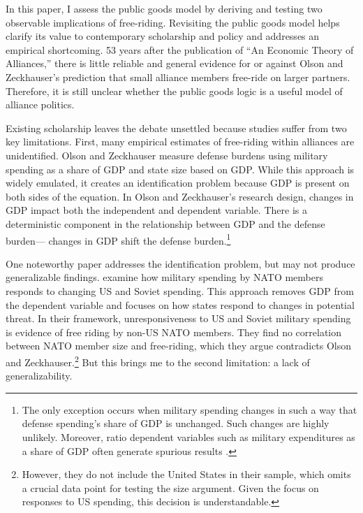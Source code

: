 \documentclass[12pt]{article}
\begin{document}
In this paper, I assess the public goods model by deriving and testing two observable implications of free-riding. 
Revisiting the public goods model helps clarify its value to contemporary scholarship and policy and addresses an empirical shortcoming.
53 years after the publication of ``An Economic Theory of Alliances,'' there is little reliable and general evidence for or against Olson and Zeckhauser's prediction that small alliance members free-ride on larger partners. 
Therefore, it is still unclear whether the public goods logic is a useful model of alliance politics. 


Existing scholarship leaves the debate unsettled because studies suffer from two key limitations.
First, many empirical estimates of free-riding within alliances are unidentified.
Olson and Zeckhauser measure defense burdens using military spending as a share of GDP and state size based on GDP.
While this approach is widely emulated, it creates an identification problem because GDP is present on both sides of the equation.
In Olson and Zeckhauser's research design, changes in GDP impact both the independent and dependent variable. 
There is a deterministic component in the relationship between GDP and the defense burden--- changes in GDP shift the defense burden.\footnote{
The only exception occurs when military spending changes in such a way that defense spending's share of GDP is unchanged. Such changes are highly unlikely. Moreover, ratio dependent variables such as military expenditures as a share of GDP often generate spurious results \citep{Kronmal1993}.}  
 

One noteworthy paper addresses the identification problem, but may not produce generalizable findings. 
\citet{PluemperNeumayer2015} examine how military spending by NATO members responds to changing US and Soviet spending.
This approach removes GDP from the dependent variable and focuses on how states respond to changes in potential threat.  
In their framework, unresponsiveness to US and Soviet military spending is evidence of free riding by non-US NATO members.
They find no correlation between NATO member size and free-riding, which they argue contradicts Olson and Zeckhauser.\footnote{
However, they do not include the United States in their sample, which omits a crucial data point for testing the size argument. Given the focus on responses to US spending, this decision is understandable.}
But this brings me to the second limitation: a lack of generalizability. 
\end{document}
